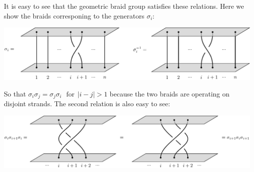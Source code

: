 \documentclass[aps, prl, letterpaper, twocolumn, superscriptaddress, notitlepage, 10pt]{revtex4-1}
\begin{document}
It is easy to see that the geometric braid group satisfies these
relations. Here we show the braids corresponing to the generators $\sigma_i:$
\begin{center}
\includegraphics[]{pic-braid-sigma.pdf}
\end{center}
So that 
$\sigma_i \sigma_j = \sigma_j \sigma_i \ \ \ \mbox{for}\ \ |i-j|>1$
because the two braids are operating on disjoint strands.
The second relation is also easy to see:
\begin{center}
\includegraphics[]{pic-braid-YB.pdf}
\end{center}
\end{document}
